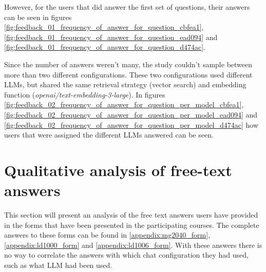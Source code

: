 However, for the users that did answer the first set of questions, their answers can be seen in figures \ref{fig:feedback_01_frequency_of_answer_for_question_cbfea1}, \ref{fig:feedback_01_frequency_of_answer_for_question_ead094} and \ref{fig:feedback_01_frequency_of_answer_for_question_d474ac}.




















Since the number of answers weren't many, the study couldn’t sample between more than two different configurations. These two configurations used different \gls{LLM}s, but shared the same retrieval strategy (vector search) and embedding function (\textit{openai/text-embedding-3-large}). In figures \ref{fig:feedback_02_frequency_of_answer_for_question_per_model_cbfea1}, \ref{fig:feedback_02_frequency_of_answer_for_question_per_model_ead094} and \ref{fig:feedback_02_frequency_of_answer_for_question_per_model_d474ac} how users that were assigned the different \gls{LLM}s answered can be seen.











\section{Qualitative analysis of free-text answers}
\label{sec:qualitative_analysis_of_user_responses}


This section will present an analysis of the free text answers users have provided in the forms that have been presented in the participating courses. The complete answers to these forms can be found in \autoref{appendix:mg2040_form}, \autoref{appendix:ld1000_form} and \autoref{appendix:ld1006_form}. With these answers there is no way to correlate the answers with which chat configuration they had used, such as what \gls{LLM} had been used.


